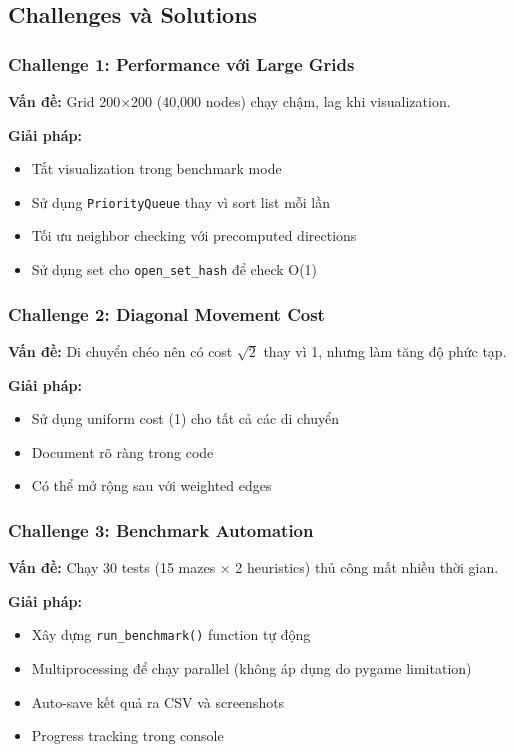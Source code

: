 \documentclass[12pt,a4paper]{article}
\begin{document}
\subsection{Challenges và Solutions}

\subsubsection{Challenge 1: Performance với Large Grids}
\textbf{Vấn đề:} Grid 200×200 (40,000 nodes) chạy chậm, lag khi visualization.

\textbf{Giải pháp:}
\begin{itemize}
    \item Tắt visualization trong benchmark mode
    \item Sử dụng \texttt{PriorityQueue} thay vì sort list mỗi lần
    \item Tối ưu neighbor checking với precomputed directions
    \item Sử dụng set cho \texttt{open\_set\_hash} để check O(1)
\end{itemize}

\subsubsection{Challenge 2: Diagonal Movement Cost}
\textbf{Vấn đề:} Di chuyển chéo nên có cost $\sqrt{2}$ thay vì 1, nhưng làm tăng độ phức tạp.

\textbf{Giải pháp:}
\begin{itemize}
    \item Sử dụng uniform cost (1) cho tất cả các di chuyển
    \item Document rõ ràng trong code
    \item Có thể mở rộng sau với weighted edges
\end{itemize}

\subsubsection{Challenge 3: Benchmark Automation}
\textbf{Vấn đề:} Chạy 30 tests (15 mazes × 2 heuristics) thủ công mất nhiều thời gian.

\textbf{Giải pháp:}
\begin{itemize}
    \item Xây dựng \texttt{run\_benchmark()} function tự động
    \item Multiprocessing để chạy parallel (không áp dụng do pygame limitation)
    \item Auto-save kết quả ra CSV và screenshots
    \item Progress tracking trong console
\end{itemize}
\end{document}
